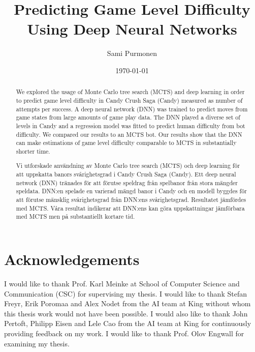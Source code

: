 \documentclass{kththesis}
\title{Predicting Game Level Difficulty Using Deep Neural Networks}
\author{Sami Purmonen}
\date{\today}
\begin{document}


\flyleaf

\begin{abstract}
We explored the usage of Monte Carlo tree search (MCTS) and deep learning in order to predict game level difficulty in Candy Crush Saga (Candy) measured as number of attempts per success. A deep neural network (DNN) was trained to predict moves from game states from large amounts of game play data. The DNN played a diverse set of levels in Candy and a regression model was fitted to predict human difficulty from bot difficulty. We compared our results to an MCTS bot. Our results show that the DNN can make estimations of game level difficulty comparable to MCTS in substantially shorter time.
\end{abstract}

\clearpage

\begin{otherlanguage}{swedish}
  \begin{abstract}
  Vi utforskade användning av Monte Carlo tree search (MCTS) och deep learning för att uppskatta banors svårighetsgrad i Candy Crush Saga (Candy). Ett deep neural network (DNN) tränades för att förutse speldrag från spelbanor från stora mängder speldata. DNN:en spelade en varierad mängd banor i Candy och en modell byggdes för att förutse mänsklig svårighetsgrad från DNN:ens svårighetsgrad. Resultatet jämfördes med MCTS. Våra resultat indikerar att DNN:ens kan göra uppskattningar jämförbara med MCTS men på substantiellt kortare tid.
  \end{abstract}
\end{otherlanguage}

\chapter*{Acknowledgements}
\thispagestyle{empty}

I would like to thank Prof. Karl Meinke at School of Computer Science and Communication (CSC) for supervising my thesis. I would like to thank Stefan Freyr, Erik Poromaa and Alex Nodet from the AI team at King without whom this thesis work would not have been possible. I would also like to thank John Pertoft, Philipp Eisen and Lele Cao from the AI team at King for continuously providing feedback on my work. I would like to thank Prof. Olov Engwall for examining my thesis.

\clearpage

\cleardoublepage
\end{document}
